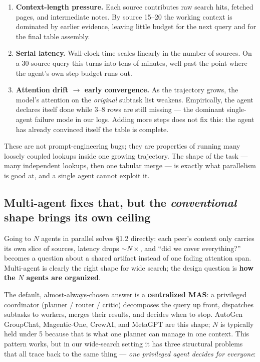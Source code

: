 \documentclass[11pt]{article}
\begin{document}
\begin{enumerate}[leftmargin=1.5em]
  \item \textbf{Context-length pressure.} Each source contributes raw search hits, fetched pages, and intermediate notes. By source 15--20 the working context is dominated by earlier evidence, leaving little budget for the next query and for the final table assembly.
  \item \textbf{Serial latency.} Wall-clock time scales linearly in the number of sources. On a 30-source query this turns into tens of minutes, well past the point where the agent's own step budget runs out.
  \item \textbf{Attention drift $\to$ early convergence.} As the trajectory grows, the model's attention on the \emph{original} subtask list weakens. Empirically, the agent declares itself done while 3--8 rows are still missing --- the dominant single-agent failure mode in our logs. Adding more steps does not fix this: the agent has already convinced itself the table is complete.
\end{enumerate}

These are not prompt-engineering bugs; they are properties of running many loosely coupled lookups inside one growing trajectory. The shape of the task --- many independent lookups, then one tabular merge --- is exactly what parallelism is good at, and a single agent cannot exploit it.

\subsection{Multi-agent fixes that, but the \emph{conventional} shape brings its own ceiling}

Going to $N$ agents in parallel solves \S1.2 directly: each peer's context only carries its own slice of sources, latency drops $\sim N\times$, and ``did we cover everything?'' becomes a question about a shared artifact instead of one fading attention span. Multi-agent is clearly the right shape for wide search; the design question is \textbf{how the $N$ agents are organized}.

The default, almost-always-chosen answer is a \textbf{centralized MAS}: a privileged coordinator (planner / router / critic) decomposes the query up front, dispatches subtasks to workers, merges their results, and decides when to stop. AutoGen GroupChat, Magentic-One, CrewAI, and MetaGPT are this shape; $N$ is typically held under 5 because that is what one planner can manage in one context. This pattern works, but in our wide-search setting it has three structural problems that all trace back to the same thing --- \emph{one privileged agent decides for everyone}:
\end{document}
